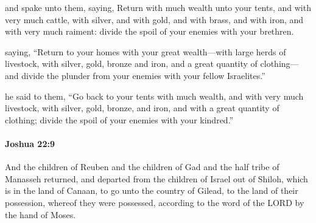 			\begin{versebox}
					\item[BHS] 
					\item[ASV] and spake unto them, saying, Return with much wealth unto your tents, and with very much cattle, with silver, and with gold, and with brass, and with iron, and with very much raiment: divide the spoil of your enemies with your brethren.
					\item[NIV] saying, “Return to your homes with your great wealth—with large herds of livestock, with silver, gold, bronze and iron, and a great quantity of clothing—and divide the plunder from your enemies with your fellow Israelites.”
					\item[NRSV] he said to them, “Go back to your tents with much wealth, and with very much livestock, with silver, gold, bronze, and iron, and with a great quantity of clothing; divide the spoil of your enemies with your kindred.”
			\end{versebox}

		\paragraph{Joshua 22:9} %
			\label{JOSHUA-22-9}

			And the children of Reuben and the children of Gad and the half tribe of Manasseh returned, and departed from the children of Israel out of Shiloh, which is in the land of Canaan, to go unto the country of Gilead, to the land of their possession, whereof they were possessed, according to the word of the LORD by the hand of Moses.

